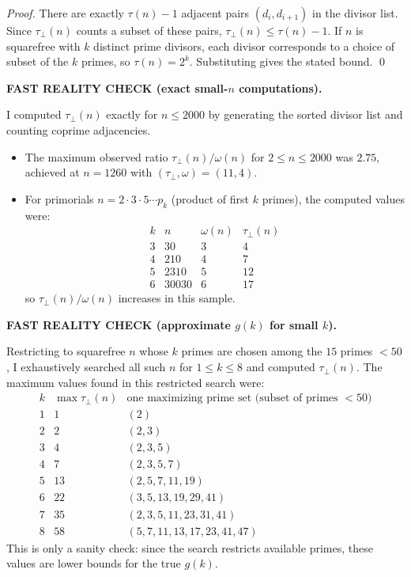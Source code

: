 \smallskip
\noindent\emph{Proof.}
There are exactly $\tau(n)-1$ adjacent pairs $(d_i,d_{i+1})$ in the divisor list. Since $\tau_\perp(n)$ counts a subset of these pairs, $\tau_\perp(n)\le \tau(n)-1$.
If $n$ is squarefree with $k$ distinct prime divisors, each divisor corresponds to a choice of subset of the $k$ primes, so $\tau(n)=2^k$. Substituting gives the stated bound. \qed

\smallskip
\noindent\textbf{FAST REALITY CHECK (exact small-$n$ computations).}

\smallskip
\noindent
I computed $\tau_\perp(n)$ exactly for $n\le 2000$ by generating the sorted divisor list and counting coprime adjacencies.
\begin{itemize}
\item The maximum observed ratio $\tau_\perp(n)/\omega(n)$ for $2\le n\le 2000$ was $2.75$, achieved at $n=1260$ with $(\tau_\perp,\omega)=(11,4)$.
\item For primorials $n=2\cdot3\cdot5\cdots p_k$ (product of first $k$ primes), the computed values were:
\[
\begin{array}{r|r|r|r}
 k & n & \omega(n) & \tau_\perp(n) \\\hline
 3&30&3&4\\
 4&210&4&7\\
 5&2310&5&12\\
 6&30030&6&17
\end{array}
\]
so $\tau_\perp(n)/\omega(n)$ increases in this sample.
\end{itemize}

\smallskip
\noindent\textbf{FAST REALITY CHECK (approximate $g(k)$ for small $k$).}

\smallskip
\noindent
Restricting to squarefree $n$ whose $k$ primes are chosen among the $15$ primes $<50$, I exhaustively searched all such $n$ for $1\le k\le 8$ and computed $\tau_\perp(n)$. The maximum values found in this restricted search were:
\[
\begin{array}{r|r|l}
 k & \max \tau_\perp(n) & \text{one maximizing prime set (subset of primes $<50$)} \\\hline
 1&1&(2)\\
 2&2&(2,3)\\
 3&4&(2,3,5)\\
 4&7&(2,3,5,7)\\
 5&13&(2,5,7,11,19)\\
 6&22&(3,5,13,19,29,41)\\
 7&35&(2,3,5,11,23,31,41)\\
 8&58&(5,7,11,13,17,23,41,47)
\end{array}
\]
This is only a sanity check: since the search restricts available primes, these values are lower bounds for the true $g(k)$.

